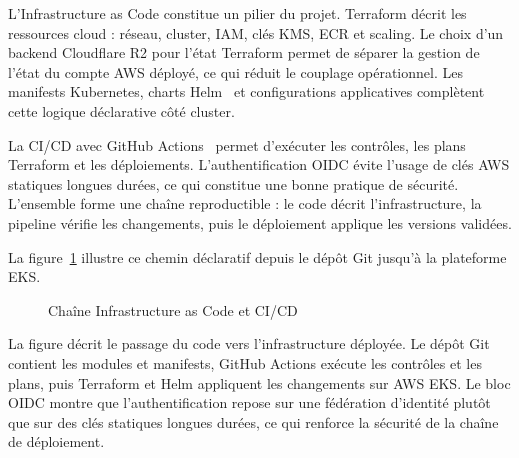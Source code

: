 L'Infrastructure as Code constitue un pilier du projet. Terraform décrit les ressources cloud : réseau, cluster, IAM, clés KMS, ECR et scaling. Le choix d'un backend Cloudflare R2 pour l'état Terraform permet de séparer la gestion de l'état du compte AWS déployé, ce qui réduit le couplage opérationnel. Les manifests Kubernetes, charts Helm~\cite{helm} et configurations applicatives complètent cette logique déclarative côté cluster.

La CI/CD avec GitHub Actions~\cite{github-actions} permet d'exécuter les contrôles, les plans Terraform et les déploiements. L'authentification OIDC évite l'usage de clés AWS statiques longues durées, ce qui constitue une bonne pratique de sécurité. L'ensemble forme une chaîne reproductible : le code décrit l'infrastructure, la pipeline vérifie les changements, puis le déploiement applique les versions validées.

La figure~\ref{fig:iac-cicd} illustre ce chemin déclaratif depuis le dépôt Git jusqu'à la plateforme EKS.

\begin{figure}[H]
\centering
\vspace{0.4em}
\vspace{0.6em}
\caption{Chaîne Infrastructure as Code et CI/CD}
\label{fig:iac-cicd}
\end{figure}
\vspace{0.8em}

La figure décrit le passage du code vers l'infrastructure déployée. Le dépôt Git contient les modules et manifests, GitHub Actions exécute les contrôles et les plans, puis Terraform et Helm appliquent les changements sur AWS EKS. Le bloc OIDC montre que l'authentification repose sur une fédération d'identité plutôt que sur des clés statiques longues durées, ce qui renforce la sécurité de la chaîne de déploiement.

